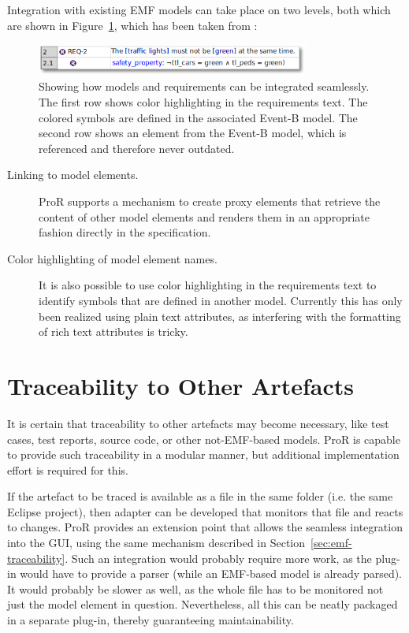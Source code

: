 \documentclass{template/openetcs_report}
\begin{document}
Integration with existing EMF models can take place on two levels, both which are shown in Figure~\ref{fig:proxy-1}, which has been taken from \cite{integrate-models}:

\begin{figure}
	\begin{center}
	\includegraphics[width=0.8\textwidth]{img/proxy-1.png}
	\end{center}
	\caption[Seamless integration of models and requirements]{Showing how models and requirements can be integrated seamlessly. The first row shows color highlighting in the requirements text.  The colored symbols are defined in the associated Event-B model.  The second row shows an element from the Event-B model, which is referenced and therefore never outdated.}
	\label{fig:proxy-1}
\end{figure} 

\begin{description}
\item[Linking to model elements.]  ProR supports a mechanism to create proxy elements that retrieve the content of other model elements and renders them in an appropriate fashion directly in the specification.
\item[Color highlighting of model element names.] It is also possible to use color highlighting in the requirements text to identify symbols that are defined in another model.  Currently this has only been realized using plain text attributes, as interfering with the formatting of rich text attributes is tricky.
\end{description}

\section{Traceability to Other Artefacts}
\label{sec:other-traceability}

It is certain that traceability to other artefacts may become necessary, like test cases, test reports, source code, or other not-EMF-based models.  ProR is capable to provide such traceability in a modular manner, but additional implementation effort is required for this.

If the artefact to be traced is available as a file in the same folder (i.e. the same Eclipse project), then adapter can be developed that monitors that file and reacts to changes.  ProR provides an extension point that allows the seamless integration into the GUI, using the same mechanism described in Section~\ref{sec:emf-traceability}.  Such an integration would probably require more work, as the plug-in would have to provide a parser (while an EMF-based model is already parsed).  It would probably be slower as well, as the whole file has to be monitored not just the model element in question.  Nevertheless, all this can be neatly packaged in a separate plug-in, thereby guaranteeing maintainability.
\end{document}
